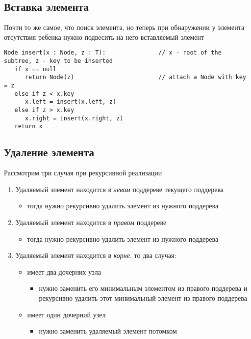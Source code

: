 \documentclass[a4paper]{article}
\begin{document}
\subsection{Вставка элемента}
Почти то же самое, что поиск элемента, но теперь при обнаружении у элемента отсутствия ребенка нужно подвесить на него вставляемый элемент
\begin{lstlisting}
Node insert(x : Node, z : T):               // x - root of the subtree, z - key to be inserted
   if x == null 
      return Node(z)                        // attach a Node with key = z
   else if z < x.key
      x.left = insert(x.left, z)
   else if z > x.key
      x.right = insert(x.right, z)
   return x
\end{lstlisting}

\subsection{Удаление элемента}
Рассмотрим три случая при рекурсивной реализации
\begin{enumerate}
    \item Удаляемый элемент находится в \textit{левом} поддереве текущего поддерева
    \begin{itemize}
        \item тогда нужно рекурсивно удалить элемент из нужного поддерева
    \end{itemize}
    \item Удаляемый элемент находится в \textit{правом} поддереве
    \begin{itemize}
        \item тогда нужно рекурсивно удалить элемент из нужного поддерева
    \end{itemize}
    \item Удаляемый элемент находится в \textit{корне}, то два случая:
    \begin{itemize}
        \item имеет два дочерних узла
        \begin{itemize}
            \item нужно заменить его минимальным элементом из правого поддерева и рекурсивно удалить этот минимальный элемент из правого поддерева
        \end{itemize}
        \item имеет один дочерний узел
        \begin{itemize}
            \item нужно заменить удаляемый элемент потомком
        \end{itemize}
    \end{itemize}
\end{enumerate}
\end{document}
